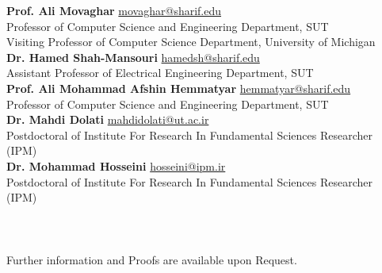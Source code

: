 \documentclass[11pt]{article}
\begin{document}
\textbf{Prof. Ali Movaghar} \href{https://scholar.google.com/citations?user=BXNelwwAAAAJ\&hl=en}{\small \faExternalLink} \hfill \href{mailto:movaghar@sharif.edu}{movaghar@sharif.edu}\\
Professor of Computer Science and Engineering Department, SUT \\
Visiting Professor of Computer Science Department, University of Michigan\\
\textbf{Dr. Hamed Shah-Mansouri} \href{https://scholar.google.com/citations?user=dcjIFccAAAAJ&hl=en&oi=ao}{\small \faExternalLink} \hfill  \href{mailto:hamedsh@sharif.edu}{hamedsh@sharif.edu}\\
Assistant Professor of Electrical Engineering Department, SUT\\
\textbf{Prof. Ali Mohammad Afshin Hemmatyar} \href{https://scholar.google.com/citations?user=wob0AskAAAAJ&hl=en&oi=ao}{\small \faExternalLink}  \hfill \href{mailto:hemmatyar@sharif.edu}{hemmatyar@sharif.edu}\\
Professor of Computer Science and Engineering Department, SUT\\
\textbf{Dr. Mahdi Dolati} \href{https://scholar.google.com/citations?user=b7A2CXYAAAAJ&hl=en&oi=ao}{\small \faExternalLink} \hfill  \href{mailto:mahdidolati@ut.ac.ir}{mahdidolati@ut.ac.ir}\\ Postdoctoral of Institute For Research In Fundamental Sciences Researcher (IPM)\\
\textbf{Dr. Mohammad Hosseini} \href{https://scholar.google.com/citations?user=iRO-DVoAAAAJ&hl=en&oi=ao}{\small \faExternalLink} \hfill  \href{mailto:hosseini@ipm.ir}{hosseini@ipm.ir} \\ Postdoctoral of Institute For Research In Fundamental Sciences Researcher (IPM)\\\\\\\\




Further information and Proofs are available upon Request.
\end{document}

